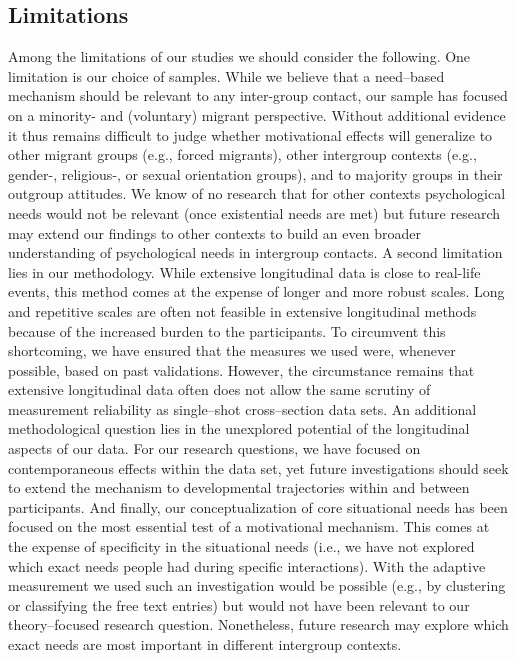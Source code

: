 \documentclass[man, 12pt, a4paper, mask]{apa7}
\theoremstyle{break}
\theoremstyle{plain}
\begin{document}
\subsection{Limitations}
Among the limitations of our studies we should consider the following. One limitation is our choice of samples. While we believe that a need–based mechanism should be relevant to any inter-group contact, our sample has focused on a minority- and (voluntary) migrant perspective. Without additional evidence it thus remains difficult to judge whether motivational effects will generalize to other migrant groups (e.g., forced migrants), other intergroup contexts (e.g., gender-, religious-, or sexual orientation groups), and to majority groups in their outgroup attitudes. We know of no research that for other contexts psychological needs would not be relevant (once existential needs are met) but future research may extend our findings to other contexts to build an even broader understanding of psychological needs in intergroup contacts. A second limitation lies in our methodology. While extensive longitudinal data is close to real-life events, this method comes at the expense of longer and more robust scales. Long and repetitive scales are often not feasible in extensive longitudinal methods because of the increased burden to the participants. To circumvent this shortcoming, we have ensured that the measures we used were, whenever possible, based on past validations. However, the circumstance remains that extensive longitudinal data often does not allow the same scrutiny of measurement reliability as single–shot cross–section data sets. An additional methodological question lies in the unexplored potential of the longitudinal aspects of our data. For our research questions, we have focused on contemporaneous effects within the data set, yet future investigations should seek to extend the mechanism to developmental trajectories within and between participants. And finally, our conceptualization of core situational needs has been focused on the most essential test of a motivational mechanism. This comes at the expense of specificity in the situational needs (i.e., we have not explored which exact needs people had during specific interactions). With the adaptive measurement we used such an investigation would be possible (e.g., by clustering or classifying the free text entries) but would not have been relevant to our theory–focused research question. Nonetheless, future research may explore which exact needs are most important in different intergroup contexts. 
\end{document}
